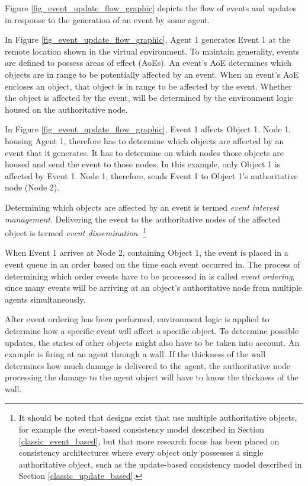 Figure \ref{fig_event_update_flow_graphic} depicts the flow of events and updates in response to the generation of an event by some agent.

In Figure \ref{fig_event_update_flow_graphic}, Agent 1 generates Event 1 at the remote location shown in the virtual environment. To maintain generality, events are defined to possess areas of effect (AoEs). An event's AoE determines which objects are in range to be potentially affected by an event. When an event's AoE encloses an object, that object is in range to be affected by the event. Whether the object is affected by the event, will be determined by the environment logic housed on the authoritative node.

In Figure \ref{fig_event_update_flow_graphic}, Event 1 affects Object 1. Node 1, housing Agent 1, therefore has to determine which objects are affected by an event that it generates. It has to determine on which nodes those objects are housed and send the event to those nodes. In this example, only Object 1 is affected by Event 1. Node 1, therefore, sends Event 1 to Object 1's authoritative node (Node 2).

Determining which objects are affected by an event is termed \emph{event interest management}. Delivering the event to the authoritative nodes of the affected object is termed \emph{event dissemination}. \footnote{It should be noted that designs exist that use multiple authoritative objects, for example the event-based consistency model described in Section \ref{classic_event_based}, but that more research focus has been placed on consistency architectures where every object only possesses a single authoritative object, such as the update-based consistency model described in Section \ref{classic_update_based}.}

When Event 1 arrives at Node 2, containing Object 1, the event is placed in a event queue in an order based on the time each event occurred in. The process of determining which order events have to be processed in is called \emph{event ordering}, since many events will be arriving at an object's authoritative node from multiple agents simultaneously.

After event ordering has been performed, environment logic is applied to determine how a specific event will affect a specific object. To determine possible updates, the states of other objects might also have to be taken into account. An example is firing at an agent through a wall. If the thickness of the wall determines how much damage is delivered to the agent, the authoritative node processing the damage to the agent object will have to know the thickness of the wall.

